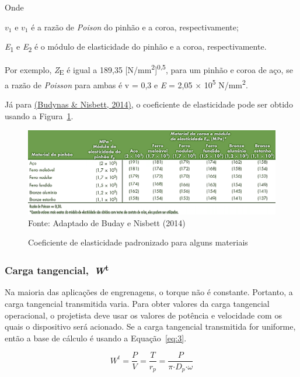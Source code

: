 \documentclass[12pt,a4paper]{article}
\begin{document}
Onde

\(v_{1}\text{\ e\ }v_{1}\) é a razão de \emph{Poison} do pinhão e a coroa,
respectivamente;

\emph{E}\textsubscript{1} e \emph{E}\textsubscript{2} é o módulo de
elasticidade do pinhão e a coroa, respectivamente.

Por exemplo, \emph{Z}\textsubscript{E} é igual a 189,35
{[}N/mm\textsuperscript{2}{]}\textsuperscript{0,5}, para um pinhão e
coroa de aço, se a razão de \emph{Poisson} para ambas é v = 0,3 e
\emph{E} = 2,05 × 10\textsuperscript{5} N/mm\textsuperscript{2}.

Já para \hyperref[csl:20]{(Budynas \& Nisbett, 2014)}, o coeficiente de elasticidade pode ser obtido usando a Figura~{\ref{fig:1}}.

\begin{figure}[!htb]
    \centering
    \caption{Coeficiente de elasticidade padronizado para alguns materiais}
    \includegraphics[scale=0.47]{Imagens/Img1.png}\\
    {\footnotesize Fonte: Adaptado de Buday e Nisbett (2014)}
    \label{fig:1}
\end{figure}

\subsubsection*{\texorpdfstring{Carga
tangencial,~\emph{W}\textsuperscript{t}}{Carga tangencial,~Wt}}

{\label{carga-tangencial-wt}}

Na maioria das aplicações de engrenagens, o torque não é constante.
Portanto, a carga tangencial transmitida varia. Para obter valores da
carga tangencial operacional, o projetista deve usar os valores de
potência e velocidade com os quais o dispositivo será acionado. Se a
carga tangencial transmitida for uniforme, então a base de cálculo é
usando a Equação~{\ref{eq:3}}.

\par\null

\begin{equation}
\label{eq:3}
W^t\mathrm{=}\frac{P}{V}\mathrm{=}\frac{T}{r_p}\mathrm{=}\frac{P}{\pi \mathrm{\cdot }D_p\mathrm{\cdot }\omega }
\end{equation}
\end{document}
